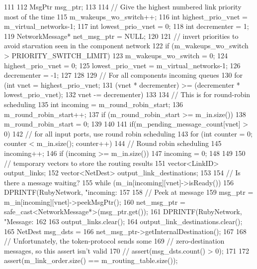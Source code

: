 \begin{DoxyCode}
111 {
112     MsgPtr msg_ptr;
113 
114     // Give the highest numbered link priority most of the time
115     m_wakeups_wo_switch++;
116     int highest_prio_vnet = m_virtual_networks-1;
117     int lowest_prio_vnet = 0;
118     int decrementer = 1;
119     NetworkMessage* net_msg_ptr = NULL;
120 
121     // invert priorities to avoid starvation seen in the component network
122     if (m_wakeups_wo_switch > PRIORITY_SWITCH_LIMIT) {
123         m_wakeups_wo_switch = 0;
124         highest_prio_vnet = 0;
125         lowest_prio_vnet = m_virtual_networks-1;
126         decrementer = -1;
127     }
128 
129     // For all components incoming queues
130     for (int vnet = highest_prio_vnet;
131          (vnet * decrementer) >= (decrementer * lowest_prio_vnet);
132          vnet -= decrementer) {
133 
134         // This is for round-robin scheduling
135         int incoming = m_round_robin_start;
136         m_round_robin_start++;
137         if (m_round_robin_start >= m_in.size()) {
138             m_round_robin_start = 0;
139         }
140 
141         if(m_pending_message_count[vnet] > 0) {
142             // for all input ports, use round robin scheduling
143             for (int counter = 0; counter < m_in.size(); counter++) {
144                 // Round robin scheduling
145                 incoming++;
146                 if (incoming >= m_in.size()) {
147                     incoming = 0;
148                 }
149 
150                 // temporary vectors to store the routing results
151                 vector<LinkID> output_links;
152                 vector<NetDest> output_link_destinations;
153 
154                 // Is there a message waiting?
155                 while (m_in[incoming][vnet]->isReady()) {
156                     DPRINTF(RubyNetwork, "incoming: %
157 
158                     // Peek at message
159                     msg_ptr = m_in[incoming][vnet]->peekMsgPtr();
160                     net_msg_ptr = safe_cast<NetworkMessage*>(msg_ptr.get());
161                     DPRINTF(RubyNetwork, "Message: %
162 
163                     output_links.clear();
164                     output_link_destinations.clear();
165                     NetDest msg_dsts =
166                         net_msg_ptr->getInternalDestination();
167 
168                     // Unfortunately, the token-protocol sends some
169                     // zero-destination messages, so this assert isn't valid
170                     // assert(msg_dsts.count() > 0);
171 
172                     assert(m_link_order.size() == m_routing_table.size());
}}}}}
\end{DoxyCode}
